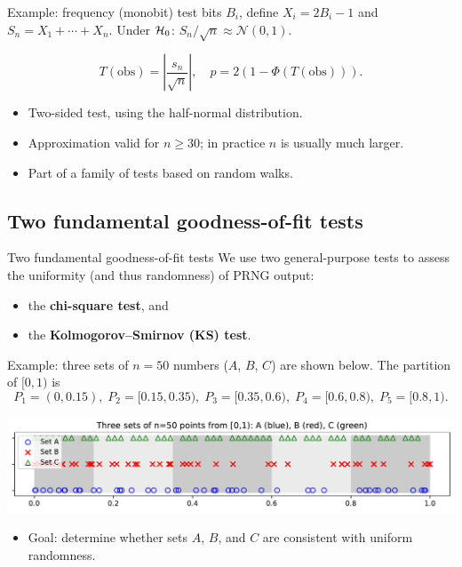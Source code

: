 \documentclass[aspectratio=169]{beamer}
\begin{document}
\begin{frame}{Example: frequency (monobit) test}
bits \(B_i\), define \(X_i = 2B_i - 1\) and \(S_n = X_1 + \cdots + X_n\).
Under ${\cal H}_0$: \(S_n / \sqrt{n} \approx \mathcal{N}(0,1)\).

\[
T(\text{obs}) = \left| \frac{s_n}{\sqrt{n}} \right|, \quad
p = 2(1 - \Phi(T(\text{obs}))).
\]

\begin{center}

\end{center}

\begin{itemize}
  \item Two-sided test, using the half-normal distribution.
  \item Approximation valid for \(n \ge 30\); in practice \(n\) is usually much larger.
  \item Part of a family of tests based on random walks.
\end{itemize}
\end{frame}

\subsection{Two fundamental goodness-of-fit tests}
\begin{frame}{Two fundamental goodness-of-fit tests}
We use two general-purpose tests to assess the uniformity (and thus randomness) of PRNG output:
\begin{itemize}
  \item the \textbf{chi-square test}, and
  \item the \textbf{Kolmogorov–Smirnov (KS) test}.
\end{itemize}

\medskip
Example: three sets of $n=50$ numbers ($A$, $B$, $C$) are shown below.
The partition of $[0,1)$ is
\[
P_1=(0,0.15),\;
P_2=[0.15,0.35),\;
P_3=[0.35,0.6),\;
P_4=[0.6,0.8),\;
P_5=[0.8,1).
\]

\begin{center}
\includegraphics[width=0.8\linewidth]{figures_pdf/ch2_prng_sets_A_B_C_points_plot.pdf}
\end{center}

\begin{itemize}
  \item Goal: determine whether sets $A$, $B$, and $C$ are consistent with uniform randomness.
\end{itemize}
\end{frame}
\end{document}
